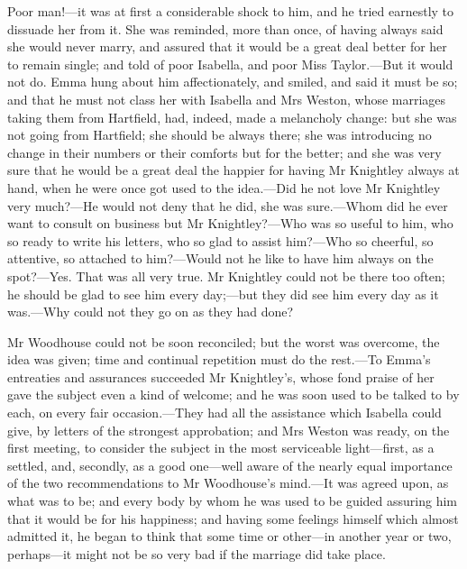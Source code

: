 Poor man!—it was at first a considerable shock to him, and he tried earnestly to dissuade her from it. She was reminded, more than once, of having always said she would never marry, and assured that it would be a great deal better for her to remain single; and told of poor Isabella, and poor Miss Taylor.—But it would not do. Emma hung about him affectionately, and smiled, and said it must be so; and that he must not class her with Isabella and Mrs Weston, whose marriages taking them from Hartfield, had, indeed, made a melancholy change: but she was not going from Hartfield; she should be always there; she was introducing no change in their numbers or their comforts but for the better; and she was very sure that he would be a great deal the happier for having Mr Knightley always at hand, when he were once got used to the idea.—Did he not love Mr Knightley very much?—He would not deny that he did, she was sure.—Whom did he ever want to consult on business but Mr Knightley?—Who was so useful to him, who so ready to write his letters, who so glad to assist him?—Who so cheerful, so attentive, so attached to him?—Would not he like to have him always on the spot?—Yes. That was all very true. Mr Knightley could not be there too often; he should be glad to see him every day;—but they did see him every day as it was.—Why could not they go on as they had done?

Mr Woodhouse could not be soon reconciled; but the worst was overcome, the idea was given; time and continual repetition must do the rest.—To Emma's entreaties and assurances succeeded Mr Knightley's, whose fond praise of her gave the subject even a kind of welcome; and he was soon used to be talked to by each, on every fair occasion.—They had all the assistance which Isabella could give, by letters of the strongest approbation; and Mrs Weston was ready, on the first meeting, to consider the subject in the most serviceable light—first, as a settled, and, secondly, as a good one—well aware of the nearly equal importance of the two recommendations to Mr Woodhouse's mind.—It was agreed upon, as what was to be; and every body by whom he was used to be guided assuring him that it would be for his happiness; and having some feelings himself which almost admitted it, he began to think that some time or other—in another year or two, perhaps—it might not be so very bad if the marriage did take place.

